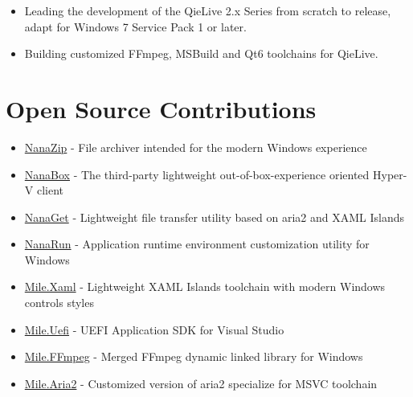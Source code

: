 \documentclass{resume}
\begin{document}
\begin{itemize}
  \item Leading the development of the QieLive 2.x Series from scratch to release, adapt for Windows 7 Service Pack 1 or later.
  \item Building customized FFmpeg, MSBuild and Qt6 toolchains for QieLive.
\end{itemize}

\section{Open Source Contributions}

\begin{itemize}
  \item \href{https://github.com/M2Team/NanaZip}{NanaZip} - File archiver intended for the modern Windows experience
  \item \href{https://github.com/M2Team/NanaBox}{NanaBox} - The third-party lightweight out-of-box-experience oriented Hyper-V client
  \item \href{https://github.com/M2Team/NanaGet}{NanaGet} - Lightweight file transfer utility based on aria2 and XAML Islands
  \item \href{https://github.com/M2Team/NanaRun}{NanaRun} - Application runtime environment customization utility for Windows
\end{itemize} 

\begin{itemize}
  \item \href{https://github.com/ProjectMile/Mile.Xaml}{Mile.Xaml} - Lightweight XAML Islands toolchain with modern Windows controls styles
  \item \href{https://github.com/ProjectMile/Mile.Uefi}{Mile.Uefi} - UEFI Application SDK for Visual Studio
  \item \href{https://github.com/ProjectMile/Mile.FFmpeg}{Mile.FFmpeg} - Merged FFmpeg dynamic linked library for Windows
  \item \href{https://github.com/ProjectMile/Mile.Aria2}{Mile.Aria2} - Customized version of aria2 specialize for MSVC toolchain
\end{itemize} 
\end{document}
